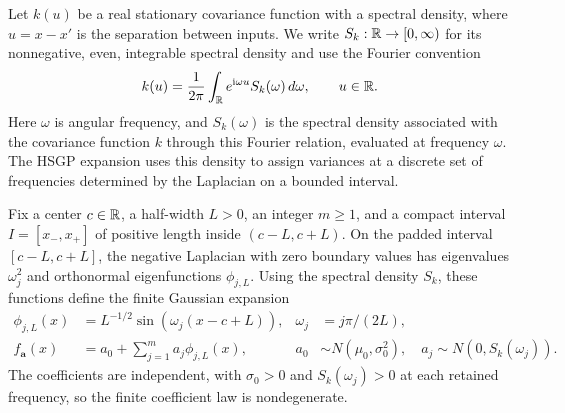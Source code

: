 Let $k(u)$ be a real stationary covariance function with a spectral
density, where $u=x-x'$ is the separation between inputs. We write
$S_k:\mathbb R\to[0,\infty)$ for its nonnegative, even, integrable spectral
density and use the Fourier convention
\[
 k(u)=\frac1{2\pi}\int_\mathbb R e^{\mathrm i\omega u}S_k(\omega)\,d\omega,
 \qquad u\in\mathbb R.
\]
Here $\omega$ is angular frequency, and $S_k(\omega)$ is the spectral
density associated with the covariance function $k$ through this
Fourier relation, evaluated at frequency $\omega$. The HSGP expansion
uses this density to assign variances at a discrete set of frequencies
determined by the Laplacian on a bounded interval.

Fix a center $c\in\mathbb R$, a half-width $L>0$, an integer $m\geq1$,
and a compact interval $I=[x_-,x_+]$ of positive length inside
$(c-L,c+L)$. On the padded interval $[c-L,c+L]$, the negative
Laplacian with zero boundary values has eigenvalues $\omega_j^2$
and orthonormal eigenfunctions $\phi_{j,L}$. Using the spectral
density $S_k$, these functions define the
finite Gaussian expansion
\begin{equation}\label{eq:finite-model}
 \begin{aligned}
 \phi_{j,L}(x)&=L^{-1/2}\sin(\omega_j(x-c+L)),
 &\omega_j&=j\pi/(2L),\\
 f_{\boldsymbol a}(x)&=a_0+\sum_{j=1}^ma_j\phi_{j,L}(x),
 &a_0&\sim N(\mu_0,\sigma_0^2),\quad a_j\sim N(0,S_k(\omega_j)).
 \end{aligned}
\end{equation}
The coefficients are independent, with $\sigma_0>0$ and
$S_k(\omega_j)>0$ at each retained frequency, so the finite coefficient
law is nondegenerate.
